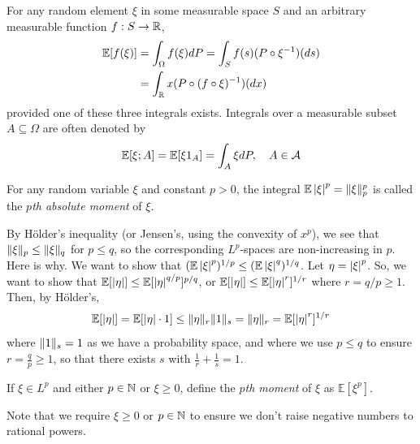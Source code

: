 For any random element $\xi$ in some measurable space $S$ and an arbitrary measurable function $f : S \to \R$,
\begin{align*}
    \mathbb{E}[f(\xi)] &= \int_{\Omega} f(\xi) dP = \int_{S} f(s)(P \circ \xi^{-1})(ds)\\
    &= \int_{\R} x (P \circ (f \circ \xi)^{-1})(dx)
\end{align*}
provided one of these three integrals exists. Integrals over a measurable subset $A \subseteq \Omega$ are often denoted by
\[ \mathbb{E}[\xi; A] = \mathbb{E}[\xi 1_{A}] = \int_{A} \xi dP, \quad A \in \cal{A} \]

\begin{definition}
    For any random variable $\xi$ and constant $p > 0$, the integral $\mathbb{E}\abs{\xi}^{p} = \norm{\xi}_{p}^{p}$ is called the \emph{$p$th absolute moment} of $\xi$.
\end{definition}

By H\"older's inequality (or Jensen's, using the convexity of $x^{p}$), we see that $\norm{\xi}_{p} \leq \norm{\xi}_{q}$ for $p \leq q$, so the corresponding $L^{p}$-spaces are non-increasing in $p$.\\

Here is why. We want to show that $(\mathbb{E}\abs{\xi}^{p})^{1/p} \leq (\mathbb{E}\abs{\xi}^{q})^{1/q}$. Let $\eta = \abs{\xi}^{p}$. So, we want to show that $\mathbb{E}[\abs{\eta}] \leq \mathbb{E}[\abs{\eta}^{q/p}]^{p/q}$, or $\mathbb{E}[\abs{\eta}] \leq \mathbb{E}[\abs{\eta}^{r}]^{1/r}$ where $r = q/p \geq 1$. Then, by H\"older's,
\[ \mathbb{E}[\abs{\eta}] = \mathbb{E}[\abs{\eta} \cdot 1] \leq \norm{\eta}_{r}\norm{1}_{s} = \norm{\eta}_{r} = \mathbb{E}[\abs{\eta}^{r}]^{1/r} \]
where $\norm{1}_{s} = 1$ as we have a probability space, and where we use $p \leq q$ to ensure $r = \frac{q}{p} \geq 1$, so that there exists $s$ with $\frac{1}{r} + \frac{1}{s} = 1$.\\

\begin{definition}
    If $\xi \in L^{p}$ and either $p \in \N$ or $\xi \geq 0$, define the \emph{$p$th moment} of $\xi$ as $\mathbb{E}[\xi^{p}]$.
\end{definition}
Note that we require $\xi \geq 0$ or $p \in \N$ to ensure we don't raise negative numbers to rational powers. 


